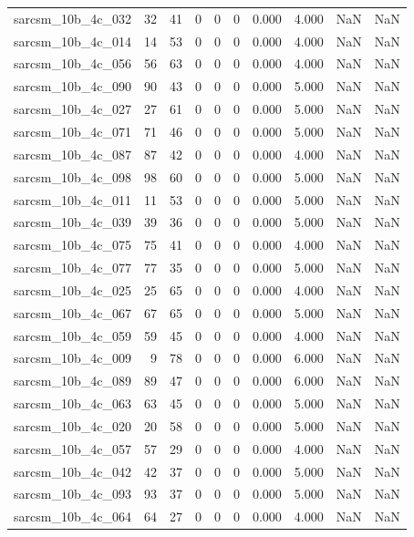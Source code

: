 \documentclass{article}
\begin{document}
\begin{longtable}{lrrrrrrrrr}
sarcsm\_10b\_4c\_032 & 32 & 41 & 0 & 0 & 0 & 0.000 & 4.000 & NaN & NaN \\
sarcsm\_10b\_4c\_014 & 14 & 53 & 0 & 0 & 0 & 0.000 & 4.000 & NaN & NaN \\
sarcsm\_10b\_4c\_056 & 56 & 63 & 0 & 0 & 0 & 0.000 & 4.000 & NaN & NaN \\
sarcsm\_10b\_4c\_090 & 90 & 43 & 0 & 0 & 0 & 0.000 & 5.000 & NaN & NaN \\
sarcsm\_10b\_4c\_027 & 27 & 61 & 0 & 0 & 0 & 0.000 & 5.000 & NaN & NaN \\
sarcsm\_10b\_4c\_071 & 71 & 46 & 0 & 0 & 0 & 0.000 & 5.000 & NaN & NaN \\
sarcsm\_10b\_4c\_087 & 87 & 42 & 0 & 0 & 0 & 0.000 & 4.000 & NaN & NaN \\
sarcsm\_10b\_4c\_098 & 98 & 60 & 0 & 0 & 0 & 0.000 & 5.000 & NaN & NaN \\
sarcsm\_10b\_4c\_011 & 11 & 53 & 0 & 0 & 0 & 0.000 & 5.000 & NaN & NaN \\
sarcsm\_10b\_4c\_039 & 39 & 36 & 0 & 0 & 0 & 0.000 & 5.000 & NaN & NaN \\
sarcsm\_10b\_4c\_075 & 75 & 41 & 0 & 0 & 0 & 0.000 & 4.000 & NaN & NaN \\
sarcsm\_10b\_4c\_077 & 77 & 35 & 0 & 0 & 0 & 0.000 & 5.000 & NaN & NaN \\
sarcsm\_10b\_4c\_025 & 25 & 65 & 0 & 0 & 0 & 0.000 & 4.000 & NaN & NaN \\
sarcsm\_10b\_4c\_067 & 67 & 65 & 0 & 0 & 0 & 0.000 & 5.000 & NaN & NaN \\
sarcsm\_10b\_4c\_059 & 59 & 45 & 0 & 0 & 0 & 0.000 & 4.000 & NaN & NaN \\
sarcsm\_10b\_4c\_009 & 9 & 78 & 0 & 0 & 0 & 0.000 & 6.000 & NaN & NaN \\
sarcsm\_10b\_4c\_089 & 89 & 47 & 0 & 0 & 0 & 0.000 & 6.000 & NaN & NaN \\
sarcsm\_10b\_4c\_063 & 63 & 45 & 0 & 0 & 0 & 0.000 & 5.000 & NaN & NaN \\
sarcsm\_10b\_4c\_020 & 20 & 58 & 0 & 0 & 0 & 0.000 & 5.000 & NaN & NaN \\
sarcsm\_10b\_4c\_057 & 57 & 29 & 0 & 0 & 0 & 0.000 & 4.000 & NaN & NaN \\
sarcsm\_10b\_4c\_042 & 42 & 37 & 0 & 0 & 0 & 0.000 & 5.000 & NaN & NaN \\
sarcsm\_10b\_4c\_093 & 93 & 37 & 0 & 0 & 0 & 0.000 & 5.000 & NaN & NaN \\
sarcsm\_10b\_4c\_064 & 64 & 27 & 0 & 0 & 0 & 0.000 & 4.000 & NaN & NaN \\

\end{longtable}
\end{document}
